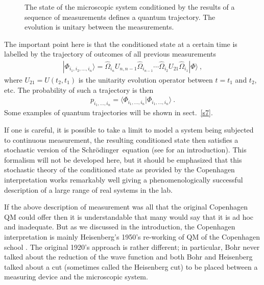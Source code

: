 \documentclass[12pt]{article}
\theoremstyle{plain}
\theoremstyle{definition}
\theoremstyle{remark}
\def\SCH{Schr\"odinger\ }
\def\bra#1{\langle #1|}
\def\ket#1{| #1\rangle}
\newcommand{\EQ}[1]{\begin{equation}\begin{split} #1
\end{split}\end{equation}}
\begin{document}
\begin{figure}[ht]
\begin{center}
\end{center}
\caption{The state of the microscopic system conditioned by the results of a sequence of measurements defines a quantum trajectory. The evolution is unitary between the measurements.}
\label{f3}
\end{figure}
The important point here is that the conditioned state at a certain time is labelled by the trajectory of 
outcomes of all previous measurements  
\EQ{
\ket{\Phi_{i_1,i_2,\ldots,i_n}}=\hat\Omega_{i_n}U_{n,n-1}\hat\Omega_{i_{n-1}}\cdots\hat\Omega_{i_2}U_{21}\hat\Omega_{i_1}\ket{\Phi}\ ,
}
where $U_{21}=U(t_2,t_1)$ is the unitarity evolution operator between $t=t_1$ and $t_2$, etc. The probability of such a trajectory is then
\EQ{
p_{i_1,\ldots,i_n}=\bra{\Phi_{i_1,\ldots,i_n}}\Phi_{i_1,\ldots,i_n}\rangle\ .
}
Some examples of quantum trajectories will be shown in sect.~\ref{s7}.

If one is careful, it is possible to take a limit to model a system being subjected to continuous measurement, the resulting conditioned state then satisfies a stochastic version of the \SCH equation (see \cite{JacobsSteck} for an introduction). This formalism will not be developed here, but it should be emphasized that this stochastic theory of the conditioned state as provided by the Copenhagen interpretation works remarkably well giving a phenomenologically successful description of a large range of real systems in the lab. 

If the above description of measurement was all that the original Copenhagen QM could offer then it is understandable that many would say that it is ad hoc and inadequate. But as we discussed in the introduction, the
Copenhagen interpretation is mainly Heisenberg's 1950's re-working of QM of the Copenhagen school \cite{Howard1}. The original 1920's approach is rather different; in particular, Bohr never talked about the reduction of the wave function and both Bohr and Heisenberg talked about a cut (sometimes called the Heisenberg cut) to be placed between a measuring device and the microscopic system.  
\end{document}

